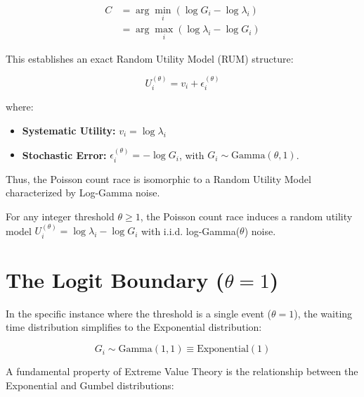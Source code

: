 \documentclass[
  man,
  floatsintext,
  longtable,
  a4paper,
  nolmodern,
  notxfonts,
  notimes,
  colorlinks=true,linkcolor=blue,citecolor=blue,urlcolor=blue]{apa7}
\providecommand{\tightlist}{%
  \setlength{\itemsep}{0pt}\setlength{\parskip}{0pt}}
\begin{document}
\[
\begin{aligned} C &= \arg \min_{i} (\log G_i - \log \lambda_i) \\ &= \arg \max_{i} (\log \lambda_i - \log G_i) \end{aligned}
\]

This establishes an exact Random Utility Model (RUM) structure:

\[
U_i^{(\theta)} = v_i + \epsilon_i^{(\theta)}
\]

where:

\begin{itemize}
\tightlist
\item
  \textbf{Systematic Utility:} \(v_i = \log \lambda_i\)\\
\item
  \textbf{Stochastic Error:} \(\epsilon_i^{(\theta)} = -\log G_i\), with
  \(G_i \sim \text{Gamma}(\theta, 1)\).
\end{itemize}

Thus, the Poisson count race is isomorphic to a Random Utility Model
characterized by Log-Gamma noise.

\begin{tcolorbox}[enhanced jigsaw, colframe=quarto-callout-note-color-frame, coltitle=black, leftrule=.75mm, opacitybacktitle=0.6, colback=white, arc=.35mm, left=2mm, opacityback=0, toptitle=1mm, rightrule=.15mm, bottomtitle=1mm, breakable, colbacktitle=quarto-callout-note-color!10!white, titlerule=0mm, bottomrule=.15mm, title={Result 1 (Log-Gamma Random Utility Family)}, toprule=.15mm]

For any integer threshold \(\theta \ge 1\), the Poisson count race
induces a random utility model
\(U_i^{(\theta)} = \log \lambda_i - \log G_i\) with i.i.d.
log-Gamma(\(\theta\)) noise.

\end{tcolorbox}

\section{\texorpdfstring{The Logit Boundary
(\(\theta = 1\))}{The Logit Boundary (\textbackslash theta = 1)}}\label{sec-logit-boundary}

In the specific instance where the threshold is a single event
(\(\theta = 1\)), the waiting time distribution simplifies to the
Exponential distribution:

\[
G_i \sim \text{Gamma}(1, 1) \equiv \text{Exponential}(1)
\]

A fundamental property of Extreme Value Theory is the relationship
between the Exponential and Gumbel distributions:
\end{document}
